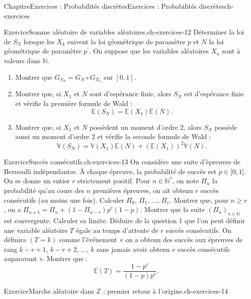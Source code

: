 \documentclass[twoside,10pt,]{book}
\numberwithin{equation}{chapter}
\newcommand{\N}{\mathbb N}
\newcommand{\Es}{\mathbb E}
\newcommand{\Va}{\mathbb V}
\begin{document}
\begin{chapterptx}{Chapitre}{Exercices : Probabilités discrètes}{}{Exercices : Probabilités discrètes}{}{}{ch-exercices}
\begin{inlineexercise}{Exercice}{Somme aléatoire de variables aléatoires.}{ch-exercices-12}
Déterminer la loi de \(S_{N}\) lorsque les \(X_{k}\) suivent la loi géométrique de paramètre \(p\) et \(N\) la loi géométrique de paramètre \(p^{\prime}\).%
On suppose que les variables aléatoires \(X_{n}\) sont à valeurs dans \(\N\).%
%
\begin{enumerate}[label={\arabic*.}]
\item{}Montrer que \(G_{S_{N}} = G_{N} \circ G_{X_{1}}\) sur \([0, 1]\).%
\item{}Montrer que, si \(X_{1}\) et \(N\) sont d'espérance finie, alors \(S_{N}\) est d'espérance finie et vérifie la première formule de Wald :%
\begin{equation*}
\Es(S_{N}) = \Es(X_{1}) \Es(N).
\end{equation*}
%
\item{}Montrer que, si \(X_{1}\) et \(N\) possèdent un moment d'ordre 2, alors \(S_{N}\) possède aussi un moment d'ordre 2 et vérifie la seconde formule de Wald :%
\begin{equation*}
\Va(S_{N}) = \Va(X_{1}) \Es(N) + (\Es(X_{1}))^{2} \Va(N).
\end{equation*}
%
\end{enumerate}
\end{inlineexercise}%
\begin{inlineexercise}{Exercice}{Succès consécutifs.}{ch-exercices-13}%
On considère une suite d'épreuves de Bernoulli indépendantes. À chaque épreuve, la probabilité de succès est \(p \in ]0, 1[\). On se donne un entier \(r\) strictement positif. Pour \(n \in \N^{*}\), on note \(\Pi_{n}\) la probabilité qu'au cours des \(n\) premières épreuves, on ait obtenu \(r\) succès consécutifs (au moins une fois).%
Calculer \(\Pi_{0}\), \(\Pi_{1}\), ..., \(\Pi_{r}\).%
Montrer que, pour \(n \geqslant r\), on a \(\Pi_{n+1} = \Pi_{n} + (1 - \Pi_{n-r}) p^{r} (1 - p)\).%
Montrer que la suite \((\Pi_{n})_{n \in \N}\) est convergente. Calculer sa limite.%
Déduire de la question 1 que l'on peut définir une variable aléatoire \(T\) égale au temps d'attente de \(r\) succès consécutifs. On définira \((T = k)\) comme l'événement « on a obtenu des succès aux épreuves de rang \(k - r + 1\), \(k - r + 2\), ..., \(k\) sans jamais avoir obtenu \(r\) succès consécutifs auparavant ».%
Montrer que :%
\begin{equation*}
\Es(T) = \frac{1 - p^{r}}{(1 - p) p^{r}}.
\end{equation*}
%
\end{inlineexercise}%
\begin{inlineexercise}{Exercice}{Marche aléatoire dans \(\mathbb{Z}\) : premier retour à l'origine.}{ch-exercices-14}%

\end{inlineexercise}
\end{chapterptx}
\end{document}

